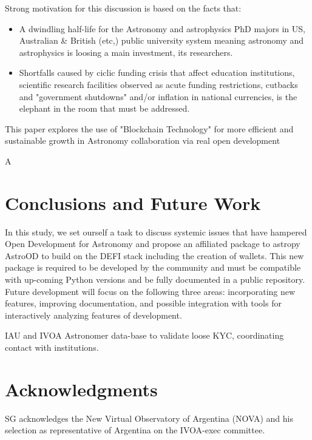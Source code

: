 \documentclass[final,5p,times,twocolumn,authoryear]{elsarticle}
\begin{document}
   Strong motivation for this discussion is based on the facts that:
   
\begin{itemize}
       \item A dwindling half-life for the Astronomy and astrophysics PhD majors in US, Australian \& British (etc,) public university system meaning astronomy and astrophysics is loosing a main investment, its researchers.  
       
       \item Shortfalls caused by ciclic funding crisis that affect education institutions, scientific research facilities observed as acute funding restrictions, cutbacks and "government shutdowns" and/or inflation in national currencies, is the elephant in the room that must be addressed.
\end{itemize}
       
       
This paper explores the use of "Blockchain Technology" for more efficient and sustainable growth in Astronomy collaboration via real open development

A
\section{Conclusions and Future Work}
\label{sec:5}
%
In this study, we set ourself a task to discuss systemic issues that have hampered Open Development for Astronomy and propose an affiliated package to astropy AstroOD to build on the DEFI stack including the creation of wallets. This new package is required to be developed by the community and must be compatible with up-coming Python versions and be fully documented in a public repository. 
%
Future development will focus on the following three areas: incorporating
new features, improving documentation, and 
possible integration with tools for interactively analyzing features of development.

IAU and IVOA Astronomer data-base to validate loose KYC, coordinating contact with institutions. 

\section{Acknowledgments}
SG acknowledges the New Virtual Observatory of Argentina (NOVA) and his selection as representative of Argentina on the IVOA-exec committee.

%


\end{document}
